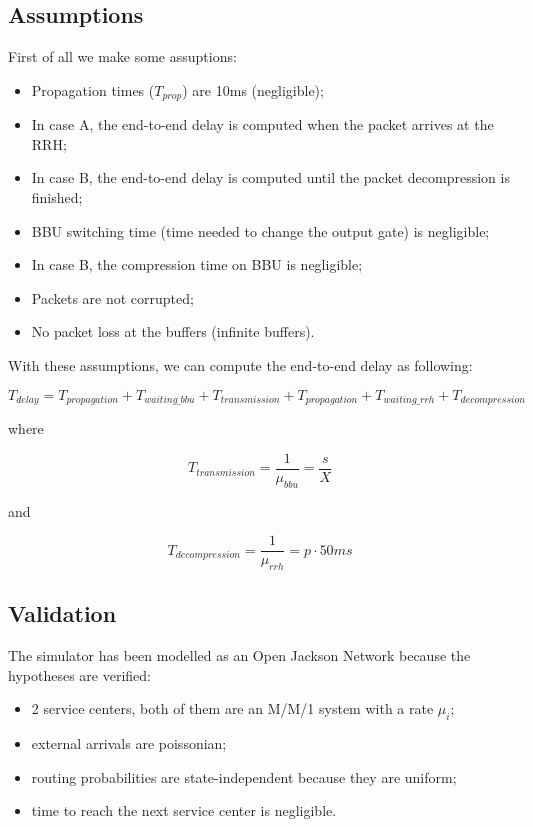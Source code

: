 \documentclass[11pt,a4paper,oneside, openright]{article}
\begin{document}
\subsection{Assumptions}
First of all we make some assuptions:
\begin{itemize}
    \item Propagation times ($ T_{prop} $) are 10ms (negligible);
    \item In case A, the end-to-end delay is computed when the packet arrives at the RRH;
    \item In case B, the end-to-end delay is computed until the packet decompression is finished;
    \item BBU switching time (time needed to change the output gate) is negligible;
    \item In case B, the compression time on BBU is negligible;
    \item Packets are not corrupted;
    \item No packet loss at the buffers (infinite buffers).
\end{itemize}

With these assumptions, we can compute the end-to-end delay as following:

$$ T_{delay} =  T_{propagation} + T_{waiting\_bbu} + T_{transmission} + T_{propagation} + T_{waiting\_rrh} + T_{decompression} $$

where 

$$ T_{transmission} = \frac{1}{\mu_{bbu}} = \frac{s}{X} $$

and

$$ T_{decompression} = \frac{1}{\mu_{rrh}} = p \cdot 50ms $$

\subsection{Validation}
The simulator has been modelled as an Open Jackson Network because the hypotheses are verified:
\begin{itemize}
    \item 2 service centers, both of them are an M/M/1 system with a rate $ \mu_{i} $;
    \item external arrivals are poissonian;
    \item routing probabilities are state-independent because they are uniform;
    \item time to reach the next service center is negligible.
\end{itemize}

\end{document}
